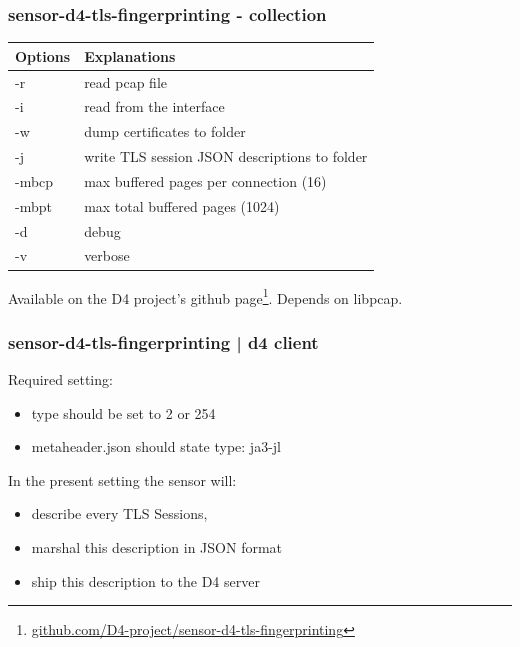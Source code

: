 \documentclass{beamer}
\begin{document}
\begin{frame}
        \frametitle{sensor-d4-tls-fingerprinting - collection}

  


\begin{tabular}{l|l}
Options & Explanations\\
\hline
  -r & read pcap file\\
  -i & read from the interface \\
  -w & dump certificates to folder\\
  -j & write TLS session JSON descriptions to folder\\
  -mbcp & max buffered pages per connection (16) \\
  -mbpt & max total buffered pages (1024) \\
  -d & debug \\
  -v & verbose
\end{tabular}

\vspace{.8cm}
Available on the D4 project's github page\footnote{\url{github.com/D4-project/sensor-d4-tls-fingerprinting}}.
Depends on libpcap.

\end{frame}


\begin{frame}[fragile]
        \frametitle{sensor-d4-tls-fingerprinting | d4 client} 
        Required setting:
        \begin{itemize}
        \item type should be set to 2 or 254
          \item metaheader.json should state type: ja3-jl
        \end{itemize}
        
        \vspace{.5cm}
        
        In the present setting the sensor will:
        \begin{itemize}
          \item describe every TLS Sessions,
          \item marshal this description in JSON format
          \item ship this description to the D4 server
        \end{itemize}
\end{frame}
\end{document}
